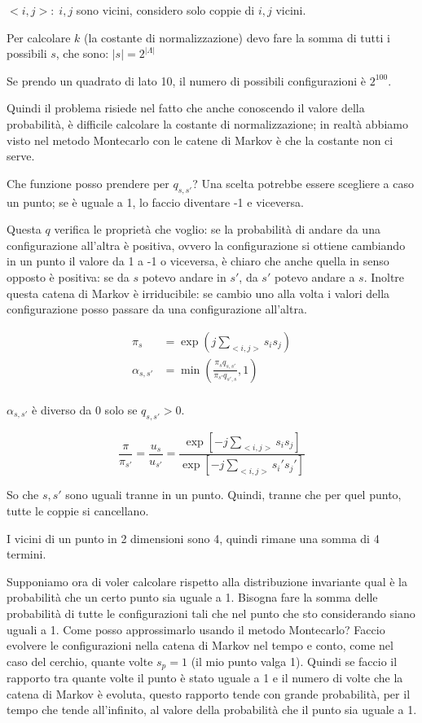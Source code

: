 \documentclass[a4paper,12pt]{book}
\begin{document}
$ <i,j>: \; i,j $ sono vicini, considero solo coppie di $ i,j $ vicini. 

Per calcolare $ k $ (la costante di normalizzazione) devo fare la somma di tutti i possibili $ s $, che sono: $ |s| = 2^{|\Lambda|} $

Se prendo un quadrato di lato 10, il numero di possibili configurazioni è $ 2^{100} $.

Quindi il problema risiede nel fatto che anche conoscendo il valore della probabilità, è difficile calcolare la costante di normalizzazione; in realtà abbiamo visto nel metodo Montecarlo con le catene di Markov è che la costante non ci serve.

Che funzione posso prendere per $ q_{s,s'} $? Una scelta potrebbe essere scegliere a caso un punto; se è uguale a 1, lo faccio diventare -1 e viceversa. 

Questa $ q $ verifica le proprietà che voglio: se la probabilità di andare da una configurazione all'altra è positiva, ovvero la configurazione si ottiene cambiando in un punto il valore da 1 a -1 o viceversa, è chiaro che anche quella in senso opposto è positiva: se da $ s $ potevo andare in $ s' $, da $ s' $ potevo andare a $ s $. Inoltre questa catena di Markov è irriducibile: se cambio uno alla volta i valori della configurazione posso passare da una configurazione all'altra.

\begin{align*}
	\pi_s & = \exp (j \sum_{<i,j>} s_i s_j) \\
	\alpha_{s,s'} & = \min \left( \frac{\pi_s q_{s,s'}}{\pi_{s'} q_{s',s}} , 1 \right) \\
\end{align*}

$\alpha_{s,s'}$ è diverso da 0 solo se $ q_{s,s'} > 0 $.%

$$ \frac{\pi}{\pi_{s'}} = \frac{u_s}{u_{s'}} = \frac{\exp \left[ -j \sum_{<i,j>} s_i s_j
	 \right]}{ \exp \left[ -j \sum_{<i,j>} s_i' s_j' \right] } $$

So che $ s,s' $ sono uguali tranne in un punto. Quindi, tranne che per quel punto, tutte le coppie si cancellano. 

I vicini di un punto in 2 dimensioni sono 4, quindi rimane una somma di 4 termini.

Supponiamo ora di voler calcolare rispetto alla distribuzione invariante qual è la probabilità che un certo punto sia uguale a 1. Bisogna fare la somma delle probabilità di tutte le configurazioni tali che nel punto che sto considerando siano uguali a 1. Come posso approssimarlo usando il metodo Montecarlo? Faccio evolvere le configurazioni nella catena di Markov nel tempo e conto, come nel caso del cerchio, quante volte $ s_p = 1 $ (il mio punto valga 1). Quindi se faccio il rapporto tra quante volte il punto è stato uguale a 1 e il numero di volte che la catena di Markov è evoluta, questo rapporto tende con grande probabilità, per il tempo che tende all'infinito, al valore della probabilità che il punto sia uguale a 1. 
\end{document}

